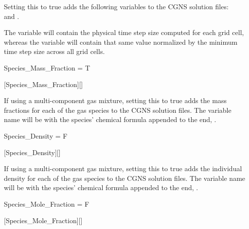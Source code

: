\begin{nmldescbody}
Setting this to true adds the following variables to the CGNS solution files:
\\
   and
  .

The variable  will contain the physical time step size
computed for each grid cell, whereas the variable 
will contain that same value normalized by the minimum time step size across
all grid cells.
\end{nmldescbody}


\begin{nmldescitem}
Species_Mass_Fraction = T
\end{nmldescitem}
[Species\_Mass\_Fraction][]

\begin{nmldescbody}
If using a multi-component gas mixture, setting this to true adds the
mass fractions for each of the gas species to the CGNS solution files.
%
The variable name will be  with the species' chemical
formula appended to the end, \forexample {}.
\end{nmldescbody}


\begin{nmldescitem}
Species_Density = F
\end{nmldescitem}
[Species\_Density][]

\begin{nmldescbody}
If using a multi-component gas mixture, setting this to true adds the
individual density for each of the gas species to the CGNS solution files.
%
The variable name will be  with the species' chemical
formula appended to the end, \forexample {}.
\end{nmldescbody}


\begin{nmldescitem}
Species_Mole_Fraction = F
\end{nmldescitem}
[Species\_Mole\_Fraction][]

